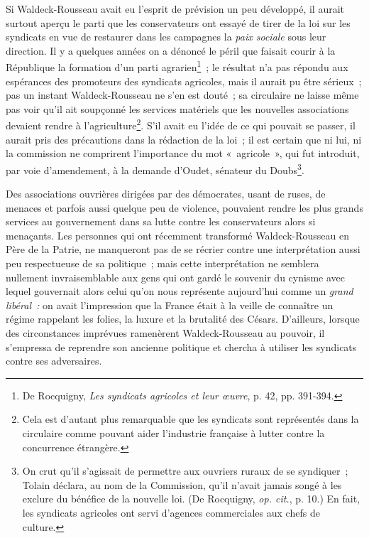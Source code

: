 \documentclass[french,twoside]{book} %
\begin{document}
Si Waldeck-Rousseau avait eu l’esprit de prévision un peu développé, il aurait surtout aperçu le parti que les conservateurs ont essayé de tirer de la loi sur les syndicats en vue de restaurer dans les campagnes la \emph{paix sociale} sous leur direction. Il y a quelques années on a dénoncé le péril que faisait courir à la République la  formation d’un parti agrarien\footnote{ \noindent De Rocquigny, \emph{Les syndicats agricoles et leur œuvre}, p. 42, pp. 391-394.
 } ; le résultat n’a pas répondu aux espérances des promoteurs des syndicats agricoles, mais il aurait pu être sérieux ; pas un instant Waldeck-Rousseau ne s’en est douté ; sa circulaire ne laisse même pas voir qu’il ait soupçonné les services matériels que les nouvelles associations devaient rendre à l’agriculture\footnote{ \noindent Cela est d’autant plus remarquable que les syndicats sont représentés dans la circulaire comme pouvant aider l’industrie française à lutter contre la concurrence étrangère.
 }. S’il avait eu l’idée de ce qui pouvait se passer, il aurait pris des précautions dans la rédaction de la loi ; il est certain que ni lui, ni la commission ne comprirent l’importance du mot « agricole », qui fut introduit, par voie d’amendement, à la demande d’Oudet, sénateur du Doubs\footnote{ \noindent On crut qu’il s’agissait de permettre aux ouvriers ruraux de se syndiquer ; Tolain déclara, au nom de la Commission, qu’il n’avait jamais songé à les exclure du bénéfice de la nouvelle loi. (De Rocquigny, \emph{op. cit.}, p. 10.) En fait, les syndicats agricoles ont servi d’agences commerciales aux chefs de culture.
 }.\par
Des associations ouvrières dirigées par des démocrates, usant de ruses, de menaces et parfois aussi quelque peu de violence, pouvaient rendre les plus grands services au gouvernement dans sa lutte contre les conservateurs alors si menaçants. Les personnes qui ont récemment transformé Waldeck-Rousseau en Père de la Patrie, ne manqueront pas de se récrier contre une interprétation aussi  peu respectueuse de sa politique ; mais cette interprétation ne semblera nullement invraisemblable aux gens qui ont gardé le souvenir du cynisme avec lequel gouvernait alors celui qu’on nous représente aujourd’hui comme un \emph{grand libéral :} on avait l’impression que la France était à la veille de connaître un régime rappelant les folies, la luxure et la brutalité des Césars. D’ailleurs, lorsque des circonstances imprévues ramenèrent Waldeck-Rousseau au pouvoir, il s’empressa de reprendre son ancienne politique et chercha à utiliser les syndicats contre ses adversaires.\par
\end{document}
